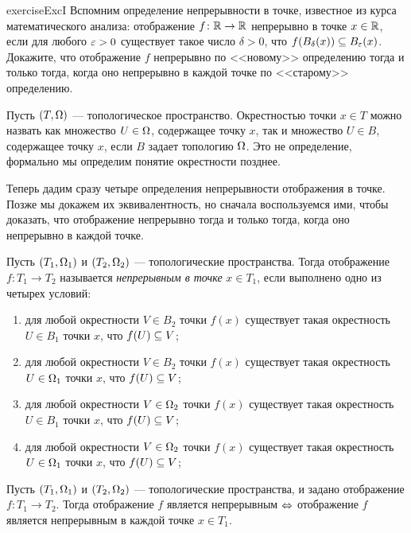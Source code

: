 \documentclass[main]{subfiles}
\begin{document}
\begin{restatable}{exercise}{ExcI}
	Вспомним определение непрерывности в точке, известное из курса математического анализа:
	отображение $ f \colon \mathbb{R} \to \mathbb{R} $ непрерывно в точке $ x \in \mathbb{R} $, если для любого $ \varepsilon > 0 $ существует такое
	число $ \delta > 0 $, что $ f(B_\delta (x)) \subseteq B_\varepsilon(x) $. Докажите, что отображение $ f $ непрерывно по
	<<новому>> определению тогда и только тогда, когда оно непрерывно в каждой точке по <<старому>> определению.
\end{restatable}

\begin{remark}
	Пусть $ (T, \Omega) $ --- топологическое пространство. Окрестностью точки $ x \in T $ можно назвать как множество
	$ U \in \Omega $, содержащее точку $ x $, так и множество $ U \in B $, содержащее точку $ x $, если $ B $ задает
	топологию $ \Omega $. Это не определение, формально мы определим понятие окрестности позднее.
\end{remark}

Теперь дадим сразу четыре определения непрерывности отображения в точке. Позже мы докажем их эквивалентность,
но сначала воспользуемся ими, чтобы доказать, что отображение непрерывно тогда и только тогда,
когда оно непрерывно в каждой точке.

\begin{definition}
	Пусть $ (T_1, \Omega_1) $ и $ (T_2, \Omega_2) $ --- топологические пространства. Тогда отображение
	$ f \colon T_1 \to T_2 $ называется \emph{непрерывным в точке} $ x \in T_1 $, если выполнено одно из
	четырех условий:
	\begin{enumerate}
		\item для любой окрестности $ V \in B_2 $ точки $ f(x) $ существует
			такая окрестность $ U \in B_1 $ точки $ x $, что $ f(U) \subseteq V $;
		\item для любой окрестности $ V \in B_2 $ точки $ f(x) $ существует
			такая окрестность $ U \in \Omega_1 $ точки $ x $, что $ f(U) \subseteq V $;
		\item для любой окрестности $ V \in \Omega_2 $ точки $ f(x) $ существует
			такая окрестность $ U \in B_1 $ точки $ x $, что $ f(U) \subseteq V $;
		\item для любой окрестности $ V \in \Omega_2 $ точки $ f(x) $ существует
			такая окрестность $ U \in \Omega_1 $ точки $ x $, что $ f(U) \subseteq V $;
	\end{enumerate}
\end{definition}

\begin{theorem}
	Пусть $ (T_1, \Omega_1) $ и $ (T_2, \Omega_2) $ --- топологические пространства, и задано
	отображение $ f \colon T_1 \to T_2 $. Тогда отображение $ f $ является непрерывным $ \Leftrightarrow $
	отображение $ f $ является непрерывным в каждой точке $ x \in T_1 $.
\end{theorem}
\end{document}
